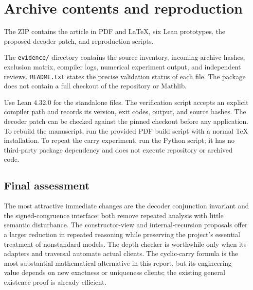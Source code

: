 \documentclass[11pt]{article}
\theoremstyle{remark}\newtheorem{remark}[theorem]{Remark}
\newcommand{\code}[1]{\nolinkurl{#1}}
\begin{document}
\section{Archive contents and reproduction}

The ZIP contains the article in PDF and LaTeX, six Lean prototypes, the proposed decoder patch, and reproduction scripts.

The \code{evidence/} directory contains the source inventory, incoming-archive hashes, exclusion matrix, compiler logs, numerical experiment output, and independent reviews. \code{README.txt} states the precise validation status of each file. The package does not contain a full checkout of the repository or Mathlib.

Use Lean 4.32.0 for the standalone files. The verification script accepts an explicit compiler path and records its version, exit codes, output, and source hashes. The decoder patch can be checked against the pinned checkout before any application. To rebuild the manuscript, run the provided PDF build script with a normal TeX installation. To repeat the carry experiment, run the Python script; it has no third-party package dependency and does not execute repository or archived code.

\begin{samepage}
\subsection*{Final assessment}

The most attractive immediate changes are the decoder conjunction invariant and the signed-congruence interface: both remove repeated analysis with little semantic disturbance. The constructor-view and internal-recursion proposals offer a larger reduction in repeated reasoning while preserving the project's essential treatment of nonstandard models. The depth checker is worthwhile only when its adapters and traversal automate actual clients. The cyclic-carry formula is the most substantial mathematical alternative in this report, but its engineering value depends on new exactness or uniqueness clients; the existing general existence proof is already efficient.
\end{samepage}
\end{document}
